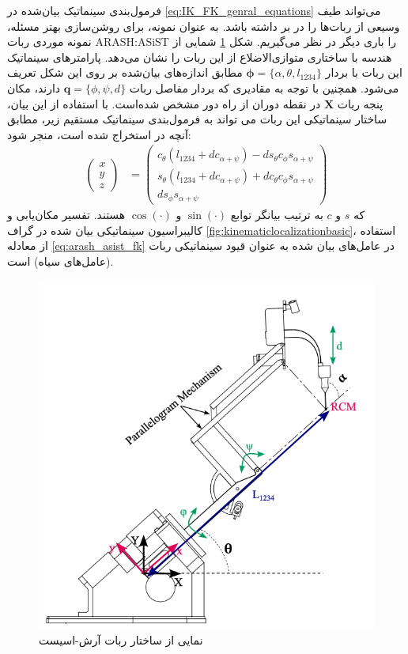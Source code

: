 فرمول‌بندی سینماتیک بیان‌شده در 
\ref{eq:IK_FK_genral_equations}
می‌تواند طیف وسیعی از ربات‌ها را در بر داشته باشد. به عنوان نمونه، برای روشن‌سازی بهتر مسئله، نمونه موردی ربات
ARASH:ASiST
را باری دیگر در نظر می‌گیریم. شکل
\ref{fig:arashasiststructure}
شمایی از هندسه با ساختاری متوازی‌الاضلاع از این ربات را نشان می‌دهد. پارامترهای سینماتیک این ربات با بردار
$\boldsymbol{\phi} = \{ \alpha, \theta , l_{1234} \} $
مطابق اندازه‌های بیان‌شده بر روی این شکل تعریف می‌شود. همچنین با توجه به مقادیری که بردار مفاصل ربات 
$ \boldsymbol{q}=\{ \phi, \psi, d \} $
دارند، مکان پنجه ربات
$\boldsymbol{X}$
در نقطه دوران از راه دور مشخص شده‌است. با استفاده از این بیان، ساختار سینماتیکی این ربات می تواند به فرمول‌بندی سینماتیک مستقیم زیر، مطابق آنچه در
\cite{hassani2021kinematic}
استخراج شده است، منجر شود:
\begin{equation} \label{eq:arash_asist_fk}
		\begin{aligned}
			\left( \begin{array}{c}
				x \\
				y \\
				z 
			\end{array} \right)
			&=
			\left( \begin{array}{c}
				c_{\theta}(l_{1234} + dc_{\alpha + \psi}) - ds_{\theta}c_{\phi}s_{\alpha + \psi} \\
				s_{\theta}(l_{1234} + dc_{\alpha + \psi}) + d c_{\theta}c_{\phi}s_{\alpha + \psi} \\
				ds_{\phi} s_{\alpha + \psi}
			\end{array} \right)
		\end{aligned}
\end{equation}
که $s$ و $c$ به ترتیب بیانگر توابع 
$\sin(\cdot)$
و
$\cos(\cdot)$
هستند. تفسیر مکان‌یابی و کالیبراسیون سینماتیکی بیان شده در گراف
\ref{fig:kinematiclocalizationbasic}،
استفاده از معادله
\ref{eq:arash_asist_fk}
در عامل‌های بیان شده به عنوان قیود سینماتیکی ربات (عامل‌های سیاه) است. 

\begin{figure}
	\centering
	\includegraphics[width=0.5\linewidth]{img/ARASH_ASIST_Structure}
	\caption{نمایی از ساختار ربات آرش-اسیست}
	\label{fig:arashasiststructure}
\end{figure}

